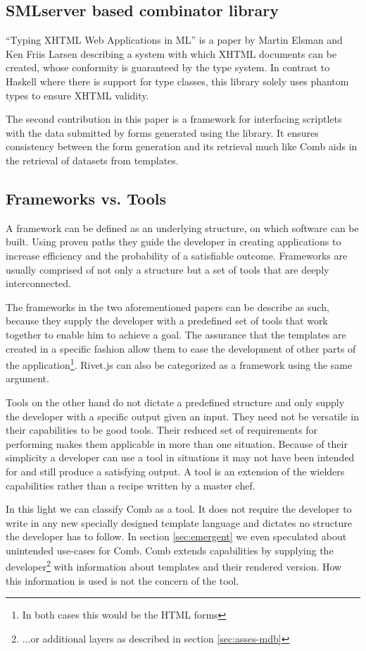 \documentclass[thesis.tex]{subfiles}
\begin{document}
\subsection{SMLserver based combinator library}
``Typing XHTML Web Applications in ML''\cite{ML} is a paper by Martin Elsman and
Ken Friis Larsen describing a system with which XHTML documents can be created,
whose conformity is guaranteed by the type system. In contrast to Haskell where
there is support for type classes, this library solely uses phantom types to
ensure XHTML validity.

The second contribution in this paper is a framework for interfacing scriptlets
with the data submitted by forms generated using the library.
It ensures consistency between the form generation and its retrieval much like
Comb aids in the retrieval of datasets from templates.



\subsection{Frameworks vs. Tools}
A framework can be defined as an underlying structure, on which software can be
built. Using proven paths they guide the developer in creating applications to
increase efficiency and the probability of a satisfiable outcome.
Frameworks are usually comprised of not only a structure but a set of tools that
are deeply interconnected.

The frameworks in the two aforementioned papers can be describe as such, because
they supply the developer with a predefined set of tools that work together to
enable him to achieve a goal. The assurance that the templates are created in a
specific fashion allow them to ease the development of other parts of the
application\footnote{In both cases this would be the HTML forms}. Rivet.js can
also be categorized as a framework using the same argument.

Tools on the other hand do not dictate a predefined structure and only supply
the developer with a specific output given an input. They need not be versatile
in their capabilities to be good tools. Their reduced set of requirements for
performing makes them applicable in more than one situation. Because of their
simplicity a developer can use a tool in situations it may not have been
intended for and still produce a satisfying output. A tool is an extension of
the wielders capabilities rather than a recipe written by a master chef.

In this light we can classify Comb as a tool. It does not require the developer
to write in any new specially designed template language and dictates no
structure the developer has to follow. In section \ref{sec:emergent} we even
speculated about unintended use-cases for Comb. Comb extends capabilities by
supplying the developer\footnote{...or additional layers as described in
section \ref{sec:asses-mdb}} with information about templates and their
rendered version. How this information is used is not the concern of the tool.
\end{document}
